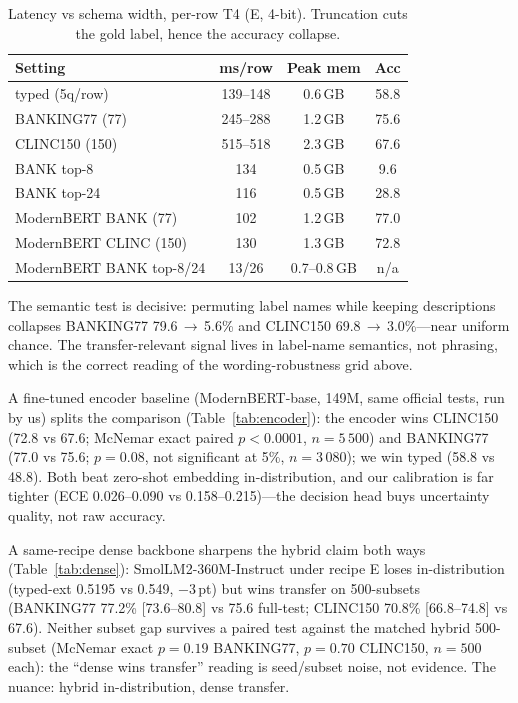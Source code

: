 \begin{table}[htbp]
\caption{Latency vs schema width, per-row T4 (E, 4-bit). Truncation cuts the
gold label, hence the accuracy collapse.}
\label{tab:lat}
\begin{center}
\setlength{\tabcolsep}{4pt}
\begin{small}
\begin{tabular}{lccc}
\toprule
Setting & ms/row & Peak mem & Acc \\
\midrule
typed (5q/row) & 139--148 & 0.6\,GB & 58.8 \\
BANKING77 (77) & 245--288 & 1.2\,GB & 75.6 \\
CLINC150 (150) & 515--518 & 2.3\,GB & 67.6 \\
BANK top-8 & 134 & 0.5\,GB & 9.6 \\
BANK top-24 & 116 & 0.5\,GB & 28.8 \\
ModernBERT BANK (77) & 102 & 1.2\,GB & 77.0 \\
ModernBERT CLINC (150) & 130 & 1.3\,GB & 72.8 \\
ModernBERT BANK top-8/24 & 13/26 & 0.7--0.8\,GB & n/a \\
\bottomrule
\end{tabular}
\end{small}
\end{center}
\end{table}

The semantic test is decisive: permuting label names while keeping
descriptions collapses BANKING77 79.6\,$\to$\,5.6\% and CLINC150
69.8\,$\to$\,3.0\%---near uniform chance. The transfer-relevant signal lives
in label-name semantics, not phrasing, which is the correct reading of the
wording-robustness grid above.

A fine-tuned encoder baseline (ModernBERT-base, 149M, same official tests,
run by us) splits the comparison (Table~\ref{tab:encoder}): the encoder wins
CLINC150 (72.8 vs 67.6; McNemar exact paired $p{<}0.0001$, $n{=}5\,500$) and
BANKING77 (77.0 vs 75.6; $p{=}0.08$, not significant at 5\%, $n{=}3\,080$);
we win typed (58.8 vs 48.8). Both beat zero-shot embedding in-distribution, and our calibration is far tighter (ECE
0.026--0.090 vs 0.158--0.215)---the decision head buys uncertainty quality,
not raw accuracy.

A same-recipe dense backbone sharpens the hybrid claim both ways
(Table~\ref{tab:dense}): SmolLM2-360M-Instruct under recipe E loses in-distribution
(typed-ext 0.5195 vs 0.549, $-$3\,pt) but wins transfer on 500-subsets
(BANKING77 77.2\% [73.6--80.8] vs 75.6 full-test; CLINC150 70.8\% [66.8--74.8]
vs 67.6). Neither subset gap survives a paired test against the matched
hybrid 500-subset (McNemar exact $p{=}0.19$ BANKING77, $p{=}0.70$ CLINC150,
$n{=}500$ each): the ``dense wins transfer'' reading is seed/subset noise,
not evidence. The nuance: hybrid in-distribution, dense transfer.

